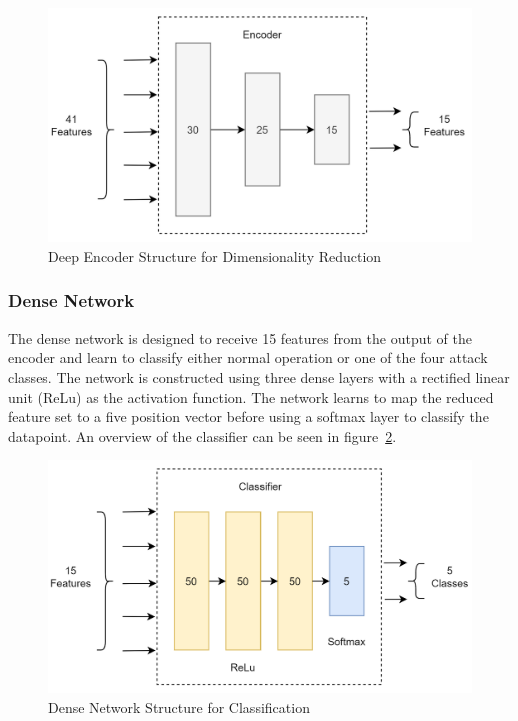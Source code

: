 \documentclass{article}
\begin{document}
\begin{figure}[!htb]
  \centering
  \includegraphics[totalheight=7cm]{figures/encoder-structure.png}
  \caption{Deep Encoder Structure for Dimensionality Reduction}
  \label{fig:encoder-structure}
  \centering
\end{figure}

\pagebreak
\subsubsection{Dense Network}

The dense network is designed to receive 15 features from the output of the encoder and learn to classify either normal operation or one of the four attack classes. The network is constructed using three dense layers with a rectified linear unit (ReLu) as the activation function. The network learns to map the reduced feature set to a five position vector before using a softmax layer to classify the datapoint. An overview of the classifier can be seen in figure~\ref{fig:dense-structure}.

\begin{figure}[!htb]
  \centering
  \includegraphics[totalheight=7cm]{figures/dense-structure.png}
  \caption{Dense Network Structure for Classification}
  \label{fig:dense-structure}
  \centering
\end{figure}
\end{document}
